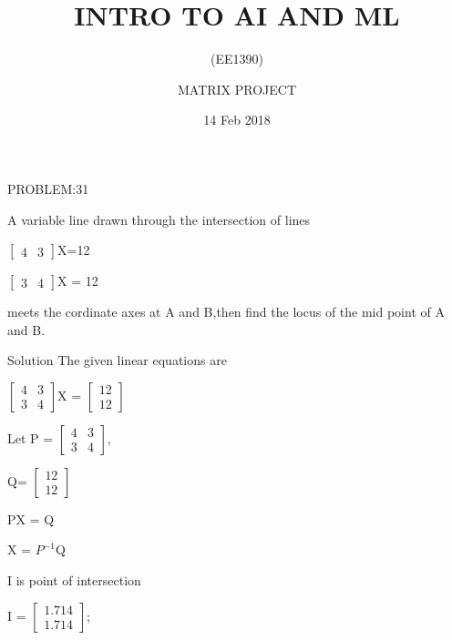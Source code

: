 \documentclass{beamer}
\title{INTRO TO AI AND ML}
\subtitle{(EE1390)}
\author{MATRIX PROJECT}
\date{14 Feb 2018}
\institute{G.NAGA DHANUSH , EE17BTECH11014 \and B.GOWRI SHANKAR REDDY , EE17BTECH11009}
\begin{document}
\begin{frame}
	
	\titlepage
	
\end{frame}

\begin{frame}[t] {PROBLEM:31}

A variable line drawn through the intersection of lines


   
    $\begin{bmatrix}
    4 & 3
    \end{bmatrix}$X=12


    $
    \begin{bmatrix}
    3 & 4
    \end{bmatrix} $X  = 12
    
meets the cordinate axes at A and B,then find the locus of the mid point of A and B.

\end{frame}

\begin{frame}{Solution}
The given linear equations are


$
\begin{bmatrix}
    4 & 3 \\
    3 & 4
\end{bmatrix}
$X =    
     $\begin{bmatrix}
    12 \\
    12
    \end{bmatrix}$ 
    
Let P =   
 $\begin{bmatrix}
   4 & 3 \\
   3 & 4
    \end{bmatrix}$,
        
    Q= $\begin{bmatrix}
    12 \\ 
    12
   
    \end{bmatrix}$    

PX = Q

X = $P^{-1}$Q

I is point of intersection

I =
 $  
\begin{bmatrix}
  
1.714 \\
1.714
\end{bmatrix}
$;
    
    

    
\end{frame}
\end{document}
